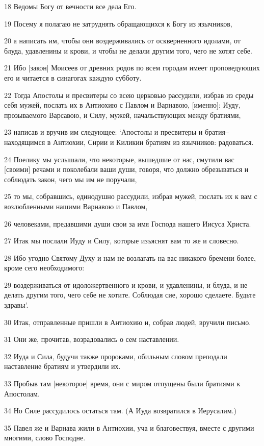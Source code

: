 \par 18 Ведомы Богу от вечности все дела Его.
\par 19 Посему я полагаю не затруднять обращающихся к Богу из язычников,
\par 20 а написать им, чтобы они воздерживались от оскверненного идолами, от блуда, удавленины и крови, и чтобы не делали другим того, чего не хотят себе.
\par 21 Ибо [закон] Моисеев от древних родов по всем городам имеет проповедующих его и читается в синагогах каждую субботу.
\par 22 Тогда Апостолы и пресвитеры со всею церковью рассудили, избрав из среды себя мужей, послать их в Антиохию с Павлом и Варнавою, [именно]: Иуду, прозываемого Варсавою, и Силу, мужей, начальствующих между братиями,
\par 23 написав и вручив им следующее: `Апостолы и пресвитеры и братия--находящимся в Антиохии, Сирии и Киликии братиям из язычников: радоваться.
\par 24 Поелику мы услышали, что некоторые, вышедшие от нас, смутили вас [своими] речами и поколебали ваши души, говоря, что должно обрезываться и соблюдать закон, чего мы им не поручали,
\par 25 то мы, собравшись, единодушно рассудили, избрав мужей, послать их к вам с возлюбленными нашими Варнавою и Павлом,
\par 26 человеками, предавшими души свои за имя Господа нашего Иисуса Христа.
\par 27 Итак мы послали Иуду и Силу, которые изъяснят вам то же и словесно.
\par 28 Ибо угодно Святому Духу и нам не возлагать на вас никакого бремени более, кроме сего необходимого:
\par 29 воздерживаться от идоложертвенного и крови, и удавленины, и блуда, и не делать другим того, чего себе не хотите. Соблюдая сие, хорошо сделаете. Будьте здравы'.
\par 30 Итак, отправленные пришли в Антиохию и, собрав людей, вручили письмо.
\par 31 Они же, прочитав, возрадовались о сем наставлении.
\par 32 Иуда и Сила, будучи также пророками, обильным словом преподали наставление братиям и утвердили их.
\par 33 Пробыв там [некоторое] время, они с миром отпущены были братиями к Апостолам.
\par 34 Но Силе рассудилось остаться там. (А Иуда возвратился в Иерусалим.)
\par 35 Павел же и Варнава жили в Антиохии, уча и благовествуя, вместе с другими многими, слово Господне.
